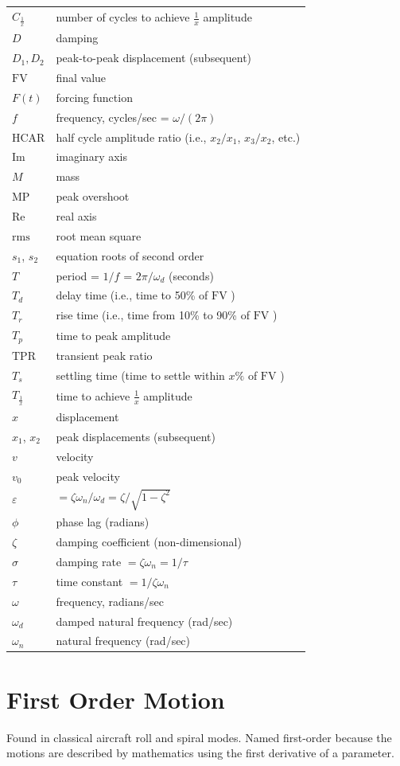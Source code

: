 \documentclass[
]{book}
\begin{document}
\begin{longtable}[]{@{}ll@{}}
\toprule
\endhead
\(C_{\frac{1}{x}}\) & number of cycles to achieve \(\frac{1}{x}\) amplitude\tabularnewline
\(D\) & damping\tabularnewline
\(D_1,D_2\) & peak-to-peak displacement (subsequent)\tabularnewline
\(\mathrm{FV}\) & final value\tabularnewline
\(F(t)\) & forcing function\tabularnewline
\(f\) & frequency, cycles/sec = \(\omega / \left( 2\pi \right)\)\tabularnewline
\(\mathrm{HCAR}\) & half cycle amplitude ratio (i.e., \(x_2/x_1\), \(x_3/x_2\), etc.)\tabularnewline
\(\mathrm{Im}\) & imaginary axis\tabularnewline
\(M\) & mass\tabularnewline
\(\mathrm{MP}\) & peak overshoot\tabularnewline
\(\mathrm{Re}\) & real axis\tabularnewline
\(\mathrm{rms}\) & root mean square\tabularnewline
\(s_1\), \(s_2\) & equation roots of second order\tabularnewline
\(T\) & period = \(1/f\) = \(2\pi/\omega_d\) (seconds)\tabularnewline
\(T_d\) & delay time (i.e., time to 50\% of \(\mathrm{FV}\) )\tabularnewline
\(T_r\) & rise time (i.e., time from 10\% to 90\% of \(\mathrm{FV}\) )\tabularnewline
\(T_p\) & time to peak amplitude\tabularnewline
\(\mathrm{TPR}\) & transient peak ratio\tabularnewline
\(T_s\) & settling time (time to settle within \(x\%\) of \(\mathrm{FV}\) )\tabularnewline
\(T_{\frac{1}{x}}\) & time to achieve \(\frac{1}{x}\) amplitude\tabularnewline
\(x\) & displacement\tabularnewline
\(x_1\), \(x_2\) & peak displacements (subsequent)\tabularnewline
\(v\) & velocity\tabularnewline
\(v_0\) & peak velocity\tabularnewline
\(\varepsilon\) & \(= \zeta \omega_n / \omega_d = \zeta / \sqrt{1 - \zeta^2}\)\tabularnewline
\(\phi\) & phase lag (radians)\tabularnewline
\(\zeta\) & damping coefficient (non-dimensional)\tabularnewline
\(\sigma\) & damping rate \(=\zeta \omega_n = 1/\tau\)\tabularnewline
\(\tau\) & time constant \(=1/\zeta \omega_n\)\tabularnewline
\(\omega\) & frequency, radians/sec\tabularnewline
\(\omega_d\) & damped natural frequency (rad/sec)\tabularnewline
\(\omega_n\) & natural frequency (rad/sec)\tabularnewline
\bottomrule
\end{longtable}

\hypertarget{first-order-motion}{%
\section{First Order Motion}\label{first-order-motion}}

Found in classical aircraft roll and spiral modes. Named first-order because the motions are described by mathematics using the first derivative of a parameter.
\end{document}
